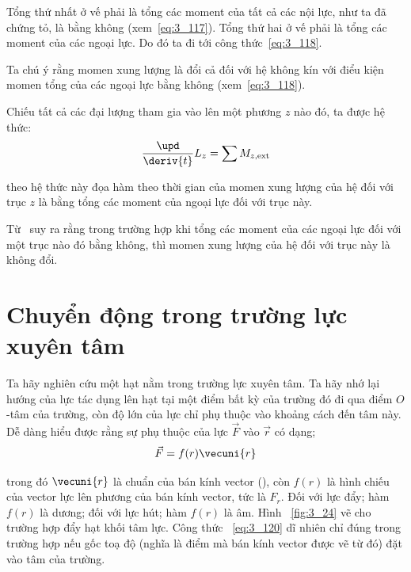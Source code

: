 \noindent
Tổng thứ nhất ở vế phải là tổng các moment của tất cả các nội lực, như ta đã chứng tỏ, là bằng không (xem~\eqref{eq:3_117}). Tổng thứ hai ở vế phải là tổng các moment của các ngoại lực. Do đó ta đi tới công thức~\eqref{eq:3_118}.

Ta chú ý rằng momen xung lượng là đổi cả đối với hệ không kín với điểu kiện momen tổng của các ngoại lực bằng không  (xem~\eqref{eq:3_118}).

Chiếu tất cả các đại lượng tham gia vào   lên một phương $z$ nào đó, ta được hệ thức:
\begin{equation}\label{eq:3_119}
\frac{\upd}{\deriv{t}} L_z = \sum M_{z,\text{ext}}
\end{equation}

\noindent
theo hệ thức này đọa hàm theo thời gian của momen xung lượng của hệ đối với trục $z$ là bằng tổng các moment của ngoại lực đối với trục này. 

Từ~ suy ra rằng trong trường hợp khi tổng các moment của các ngoại lực đối với một trục nào đó bằng không, thì momen xung lượng của hệ đối với trục này là không đổi.

\section{Chuyển động trong trường lực xuyên tâm }\label{sec:3_13}

Ta hãy nghiên cứu một hạt nằm trong trường lực xuyên tâm. Ta hãy nhớ lại hướng của lực tác dụng lên hạt tại một điểm bất kỳ của trường đó đi qua điểm $O$-tâm của trường, còn độ lớn của lực chỉ phụ thuộc vào khoảng cách đến tâm này. Dễ dàng hiểu được rằng sự phụ thuộc của lực $\vec{F}$ vào $\vec{r}$ có dạng;
\begin{equation}\label{eq:3_120}
\vec{F} = f(r) \vecuni{r}
\end{equation}

\noindent
trong đó $\vecuni{r}$ là chuẩn của bán kính vector (), còn $f(r)$ là hình chiếu của vector lực lên phương của bán kính vector, tức là $F_r$. Đối với lực đẩy; hàm $f(r)$ là dương; đối với lực hút; hàm $f(r)$ là âm. Hình ~\ref{fig:3_24} vẽ cho trường hợp đẩy hạt khối tâm lực. Công thức ~\eqref{eq:3_120} dĩ nhiên chỉ đúng trong trường hợp nếu gốc toạ độ (nghĩa là điểm mà bán kính vector được vẽ từ đó) đặt vào tâm của trường. 

